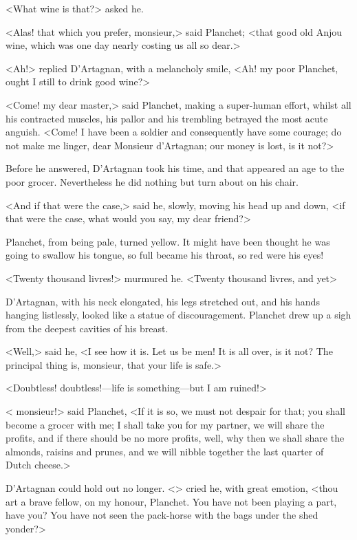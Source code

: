 <What wine is that?> asked he.

<Alas! that which you prefer, monsieur,> said Planchet; <that good old Anjou wine, which was one day nearly costing us all so dear.>

<Ah!> replied D'Artagnan, with a melancholy smile, <Ah! my poor Planchet, ought I still to drink good wine?>

<Come! my dear master,> said Planchet, making a super-human effort, whilst all his contracted muscles, his pallor and his trembling betrayed the most acute anguish. <Come! I have been a soldier and consequently have some courage; do not make me linger, dear Monsieur d'Artagnan; our money is lost, is it not?>

Before he answered, D'Artagnan took his time, and that appeared an age to the poor grocer. Nevertheless he did nothing but turn about on his chair.

<And if that were the case,> said he, slowly, moving his head up and down, <if that were the case, what would you say, my dear friend?>

Planchet, from being pale, turned yellow. It might have been thought he was going to swallow his tongue, so full became his throat, so red were his eyes!

<Twenty thousand livres!> murmured he. <Twenty thousand livres, and yet\longdash>

D'Artagnan, with his neck elongated, his legs stretched out, and his hands hanging listlessly, looked like a statue of discouragement. Planchet drew up a sigh from the deepest cavities of his breast.

<Well,> said he, <I see how it is. Let us be men! It is all over, is it not? The principal thing is, monsieur, that your life is safe.>

<Doubtless! doubtless!—life is something—but I am ruined!>

< monsieur!> said Planchet, <If it is so, we must not despair for that; you shall become a grocer with me; I shall take you for my partner, we will share the profits, and if there should be no more profits, well, why then we shall share the almonds, raisins and prunes, and we will nibble together the last quarter of Dutch cheese.>

D'Artagnan could hold out no longer. <> cried he, with great emotion, <thou art a brave fellow, on my honour, Planchet. You have not been playing a part, have you? You have not seen the pack-horse with the bags under the shed yonder?>

